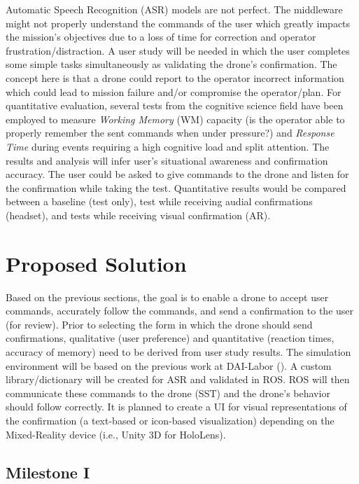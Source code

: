 Automatic Speech Recognition (ASR) models are not perfect. The middleware might not properly understand the commands of the user which greatly impacts the mission's objectives due to a loss of time for correction and operator frustration/distraction. A user study will be needed in which the user completes some simple tasks simultaneously as validating the drone's confirmation. The concept here is that a drone could report to the operator incorrect information which could lead to mission failure and/or compromise the operator/plan. For quantitative evaluation, several tests from the cognitive science field have been employed to measure \textit{Working Memory} (WM) capacity (is the operator able to properly remember the sent commands when under pressure?) and \textit{Response Time} during events requiring a high cognitive load and split attention. The results and analysis will infer user's situational awareness and confirmation accuracy. The user could be asked to give commands to the drone and listen for the confirmation while taking the test. Quantitative results would be compared between a baseline (test only), test while receiving audial confirmations (headset), and tests while receiving visual confirmation (AR).
\smallskip

\section{Proposed Solution}

Based on the previous sections, the goal is to enable a drone to accept user commands, accurately follow the commands, and send a confirmation to the user (for review). Prior to selecting the form in which the drone should send confirmations, qualitative (user preference) and quantitative (reaction times, accuracy of memory) need to be derived from user study results. The simulation environment will be based on the previous work at DAI-Labor (\cite{hrabia1}). A custom library/dictionary will be created for ASR and validated in ROS. ROS will then communicate these commands to the drone (SST) and the drone's behavior should follow correctly. It is planned to create a UI for visual representations of the confirmation (a text-based or icon-based visualization) depending on the Mixed-Reality device (i.e., Unity 3D for HoloLens). 


\subsection{Milestone I}

